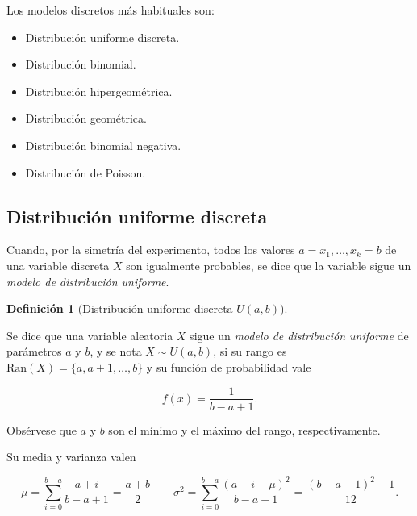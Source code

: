 \documentclass[
  spanish,
  a4paper,
]{scrreport}
\providecommand{\tightlist}{%
  \setlength{\itemsep}{0pt}\setlength{\parskip}{0pt}}
\theoremstyle{plain}
\theoremstyle{definition}
\theoremstyle{definition}
\newtheorem{definition}{Definición}[chapter]
\theoremstyle{remark}
\begin{document}
Los modelos discretos más habituales son:

\begin{itemize}
\tightlist
\item
  Distribución uniforme discreta.
\item
  Distribución binomial.
\item
  Distribución hipergeométrica.
\item
  Distribución geométrica.
\item
  Distribución binomial negativa.
\item
  Distribución de Poisson.
\end{itemize}

\subsection{Distribución uniforme
discreta}\label{distribuciuxf3n-uniforme-discreta}

Cuando, por la simetría del experimento, todos los valores
\(a=x_1,\ldots,x_k=b\) de una variable discreta \(X\) son igualmente
probables, se dice que la variable sigue un \emph{modelo de distribución
uniforme}.

\begin{definition}[Distribución uniforme discreta
\(U(a,b)\)]\protect\hypertarget{def-distribucion-uniforme-discreta}{}\label{def-distribucion-uniforme-discreta}

Se dice que una variable aleatoria \(X\) sigue un \emph{modelo de
distribución uniforme} de parámetros \(a\) y \(b\), y se nota
\(X\sim U(a,b)\), si su rango es
\(\mbox{Ran}(X) = \{a, a+1, \ldots,b\}\) y su función de probabilidad
vale

\[
f(x)=\frac{1}{b-a+1}.
\]

\end{definition}

Obsérvese que \(a\) y \(b\) son el mínimo y el máximo del rango,
respectivamente.

Su media y varianza valen

\[
\mu = \sum_{i=0}^{b-a}\frac{a+i}{b-a+1}=\frac{a+b}{2} \qquad \sigma^2 =\sum_{i=0}^{b-a}\frac{(a+i-\mu)^2}{b-a+1}=
\frac{(b-a+1)^2-1}{12}.
\]
\end{document}
